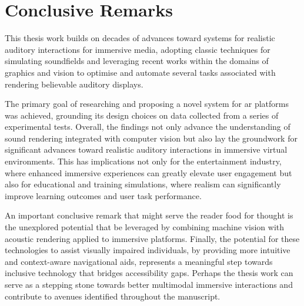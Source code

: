 \section{Conclusive Remarks}
This thesis work builds on decades of advances toward systems for realistic auditory interactions for immersive media, adopting classic techniques for simulating soundfields and leveraging recent works within the domains of graphics and vision to optimise and automate several tasks associated with rendering believable auditory displays.\par
The primary goal of researching and proposing a novel system for \acrshort{ar} platforms was achieved, grounding its design choices on data collected from a series of experimental tests. Overall, the findings not only advance the understanding of sound rendering integrated with computer vision but also lay the groundwork for significant advances toward realistic auditory interactions in immersive virtual environments. This has implications not only for the entertainment industry, where enhanced immersive experiences can greatly elevate user engagement but also for educational and training simulations, where realism can significantly improve learning outcomes and user task performance.\par
An important conclusive remark that might serve the reader food for thought is the unexplored potential that be leveraged by combining machine vision with acoustic rendering applied to immersive platforms. Finally, the potential for these technologies to assist visually impaired individuals, by providing more intuitive and context-aware navigational aids, represents a meaningful step towards inclusive technology that bridges accessibility gaps. Perhaps the thesis work can serve as a stepping stone towards better multimodal immersive interactions and contribute to avenues identified throughout the manuscript.

